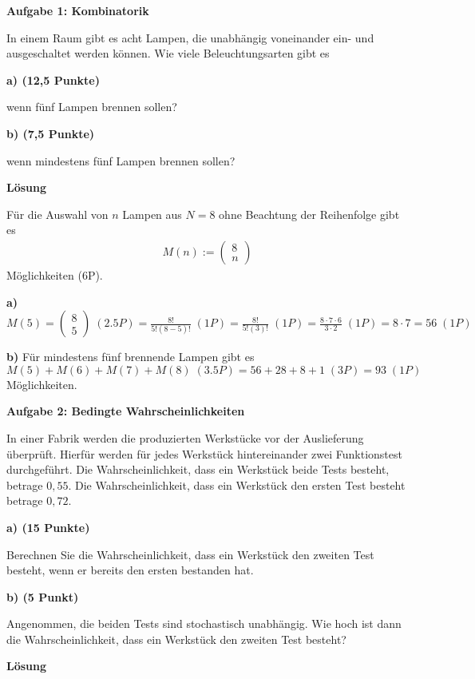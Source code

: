 \documentclass[a4paper,12pt]{article}
\begin{document}
{\bf Aufgabe 1: Kombinatorik}

In einem Raum gibt es acht Lampen, die unabhängig voneinander ein- und ausgeschaltet werden können.
Wie viele Beleuchtungsarten gibt es

{\bf a) (12,5 Punkte) }

wenn fünf Lampen brennen sollen?

{\bf b) (7,5 Punkte)}

wenn mindestens fünf Lampen brennen sollen?

{\bf Lösung}

Für die Auswahl von $n$  Lampen aus $N= 8$  ohne Beachtung der Reihenfolge gibt es 
\begin{align*}
M(n):= \begin{pmatrix} 8 \\ n\end{pmatrix}
\end{align*}
Möglichkeiten (6P).


{\bf a) }
$M(5) = \begin{pmatrix} 8 \\ 5\end{pmatrix}  \; (2.5P)= \frac{8!}{5! (8-5)!}  \;(1P) =  \frac{8!}{5! (3)!} \; (1P) =  \frac{8 \cdot 7 \cdot 6}{3 \cdot 2} \; (1P) = 8 \cdot 7 = 56 \;(1P)$

{\bf b) }
Für mindestens fünf brennende Lampen gibt es $M(5) + M(6) + M(7)  + M(8)  \; (3.5P)= 56 + 28 + 8 + 1  \; (3P)= 93  \; (1P)$ Möglichkeiten.
\hspace{10mm}



{\bf Aufgabe 2: Bedingte Wahrscheinlichkeiten}

In einer Fabrik werden die produzierten Werkstücke vor der Auslieferung überprüft. Hierfür werden für jedes Werkstück  hintereinander zwei Funktionstest durchgeführt.  Die Wahrscheinlichkeit, dass ein Werkstück beide Tests besteht, betrage $0,55$. Die Wahrscheinlichkeit, dass ein Werkstück  den ersten Test besteht betrage $0,72$. 

{\bf a) (15 Punkte) }

Berechnen Sie die Wahrscheinlichkeit, dass ein Werkstück den zweiten Test besteht, wenn er bereits den ersten bestanden hat.

{\bf b) (5 Punkt) }

Angenommen, die beiden Tests sind stochastisch unabhängig. Wie hoch ist dann die Wahrscheinlichkeit, dass ein Werkstück den zweiten Test besteht?

{\bf Lösung}
\end{document}
